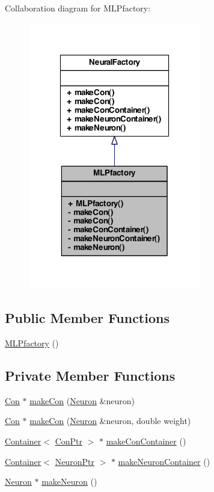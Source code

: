 Collaboration diagram for MLPfactory:
\nopagebreak
\begin{figure}[H]
\begin{center}
\leavevmode
\includegraphics[width=214pt]{class_m_l_pfactory__coll__graph}
\end{center}
\end{figure}
\subsection*{Public Member Functions}
\begin{DoxyCompactItemize}
\item 
\hyperlink{class_m_l_pfactory_a61dfce37d0344c58e275e8508b0a474c}{MLPfactory} ()
\end{DoxyCompactItemize}
\subsection*{Private Member Functions}
\begin{DoxyCompactItemize}
\item 
\hyperlink{class_con}{Con} $\ast$ \hyperlink{class_m_l_pfactory_a479b674ed4e63bb1178c091325c2cd61}{makeCon} (\hyperlink{class_neuron}{Neuron} \&neuron)
\item 
\hyperlink{class_con}{Con} $\ast$ \hyperlink{class_m_l_pfactory_a18c3770c3cb2ed6c3cb402cb814b209c}{makeCon} (\hyperlink{class_neuron}{Neuron} \&neuron, double weight)
\item 
\hyperlink{class_container}{Container}$<$ \hyperlink{_a_m_o_r_e_8h_a169bb8e5f26ce70bf2b10dec2fb5ee50}{ConPtr} $>$ $\ast$ \hyperlink{class_m_l_pfactory_a62ea35a5b7ce5f139f91b2c3edd4ad61}{makeConContainer} ()
\item 
\hyperlink{class_container}{Container}$<$ \hyperlink{_a_m_o_r_e_8h_ac1ea936c2c7728eb382278131652fef4}{NeuronPtr} $>$ $\ast$ \hyperlink{class_m_l_pfactory_a18bbb914f7b974c0f8c5dd3913f6dd1c}{makeNeuronContainer} ()
\item 
\hyperlink{class_neuron}{Neuron} $\ast$ \hyperlink{class_m_l_pfactory_ac39058170421f03dfd88c2ced318f46b}{makeNeuron} ()
\end{DoxyCompactItemize}


